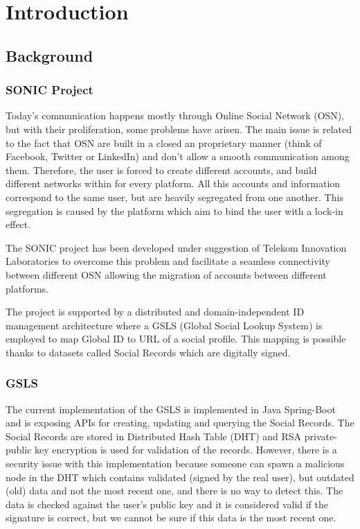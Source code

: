 \chapter{Introduction}
\label{introduction}

\section{Background}
\subsection{SONIC Project}
Today’s communication happens mostly through Online Social Network (OSN), but with their proliferation, some problems have arisen. The main issue is related to the fact that OSN are built in a closed an proprietary manner (think of Facebook, Twitter or LinkedIn) and don’t allow a smooth  communication among them. Therefore, the user is forced to create different accounts, and build different networks within for every platform. All this accounts and information correspond to the same user, but are heavily segregated from one another. This segregation is caused by the platform which aim to bind the user with a lock-in effect.

The SONIC project has been developed under suggestion of Telekom Innovation Laboratories to overcome this problem and facilitate a seamless connectivity between different OSN \citep{gondor2014sonic} allowing the migration of accounts between different platforms.

The project is supported by a distributed and domain-independent ID management architecture where a GSLS (Global Social Lookup System) is employed to map Global ID to URL of a social profile. This mapping is possible thanks to datasets called Social Records which are digitally signed.

\subsection {GSLS}
The current implementation of the GSLS is implemented in Java Spring-Boot and is exposing APIs for creating, updating and  querying the Social Records. The Social Records are stored in  Distributed Hash Table (DHT) and RSA private-public key encryption is used for validation of the records. However, there is a security issue with this implementation because someone can spawn a malicious node in the DHT which contains validated (signed by the real user), but outdated (old) data and not the most recent one, and there is no way to detect this. The data is checked against the user’s public key and it is considered valid if the signature is correct, but we cannot be sure if this data is the most recent one.

